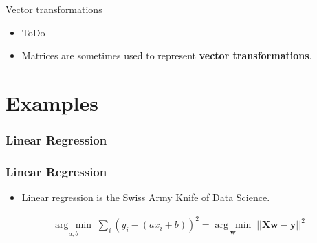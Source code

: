 \documentclass[handout]{beamer}
\newcommand{\argmin}[1]{\underset{#1}{\operatorname{arg}\,\operatorname{min}}\;}
\begin{document}
\begin{frame}[fragile]{Vector transformations}
    \begin{itemize}
        \item ToDo
        \item Matrices are sometimes used to represent \textbf{vector transformations}.
    \end{itemize}
\end{frame}



\section{Examples}
\begin{frame}[fragile]
    \frametitle{Linear Regression}
    \begin{figure}[htb]
        \centering
        
        \label{fig:regression}
	\end{figure}
\end{frame}


\begin{frame}[fragile]
    \frametitle{Linear Regression}
    \Large
    \begin{itemize}
        \item Linear regression is the Swiss Army Knife of Data Science.
    \end{itemize}
    \begin{align*}
        \argmin{a, b} \sum_i (y_i - (ax_i + b))^2 =
        \argmin{\boldsymbol{w}} || \boldsymbol{Xw} - \boldsymbol{y} ||^{2}
    \end{align*}
\end{frame}
\end{document}
